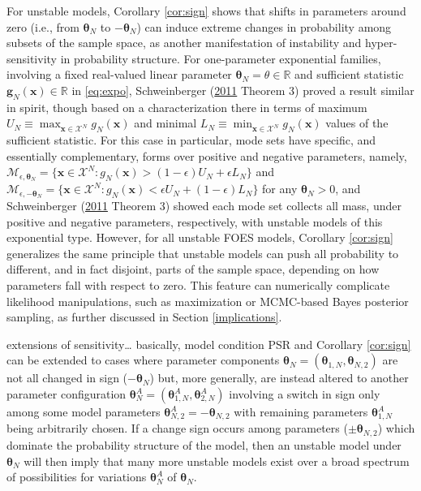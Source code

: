 \documentclass[12pt]{article}
\theoremstyle{definition}
\let\BeginKnitrBlock\begin \let\EndKnitrBlock\end
\begin{document}
For unstable models, Corollary \ref{cor:sign} shows that shifts in
parameters around zero (i.e., from \(\boldsymbol \theta_N\) to
\(-\boldsymbol \theta_N\)) can induce extreme changes in probability
among subsets of the sample space, as another manifestation of
instability and hyper-sensitivity in probability structure. For
one-parameter exponential families, involving a fixed real-valued linear
parameter \(\boldsymbol \theta_N = \theta \in \mathbb{R}\) and
sufficient statistic \(\boldsymbol g_N(\boldsymbol x)\in \mathbb{R}\) in
\eqref{eq:expo}, Schweinberger
(\protect\hyperlink{ref-schweinberger2011instability}{2011} Theorem 3)
proved a result similar in spirit, though based on a characterization
there in terms of maximum
\(U_N \equiv \max_{\boldsymbol x\in\mathcal{X}^N}g_N(\boldsymbol x)\)
and minimal
\(L_N \equiv \min_{\boldsymbol x\in\mathcal{X}^N}g_N(\boldsymbol x)\)
values of the sufficient statistic. For this case in particular, mode
sets have specific, and essentially complementary, forms over positive
and negative parameters, namely,
\(\mathcal{M}_{\epsilon, \boldsymbol \theta_N} = \{\boldsymbol x \in\mathcal{X}^N: g_N(\boldsymbol x) > (1-\epsilon) U_N + \epsilon L_N \}\)
and
\(\mathcal{M}_{\epsilon, -\boldsymbol \theta_N} = \{\boldsymbol x \in\mathcal{X}^N: g_N(\boldsymbol x) < \epsilon U_N + (1-\epsilon) L_N \}\)
for any \(\boldsymbol \theta_N>0\), and Schweinberger
(\protect\hyperlink{ref-schweinberger2011instability}{2011} Theorem 3)
showed each mode set collects all mass, under positive and negative
parameters, respectively, with unstable models of this exponential type.
However, for all unstable FOES models, Corollary \ref{cor:sign}
generalizes the same principle that unstable models can push all
probability to different, and in fact disjoint, parts of the sample
space, depending on how parameters fall with respect to zero. This
feature can numerically complicate likelihood manipulations, such as
maximization or MCMC-based Bayes posterior sampling, as further
discussed in Section \ref{implications}.

\BeginKnitrBlock{remark}[need to briefly finish]
\iffalse <span class="remark"><em>Remark (need to briefly finish). \fi{}
extensions of sensitivity\ldots{} basically, model condition PSR and
Corollary \ref{cor:sign} can be extended to cases where parameter
components
\(\boldsymbol \theta_N =(\boldsymbol \theta_{1,N}, \boldsymbol \theta_{N,2})\)
are not all changed in sign (\(-\boldsymbol \theta_N\)) but, more
generally, are instead altered to another parameter configuration
\(\boldsymbol \theta_{N}^A = ( \boldsymbol \theta_{1,N}^A, \boldsymbol \theta_{2,N}^A )\)
involving a switch in sign only among some model parameters
\(\boldsymbol \theta_{N,2}^A=- \boldsymbol \theta_{N,2}\) with remaining
parameters \(\boldsymbol \theta_{1,N}^A\) being arbitrarily chosen. If a
change sign occurs among parameters (\(\pm \boldsymbol \theta_{N,2}\))
which dominate the probability structure of the model, then an unstable
model under \(\boldsymbol \theta_N\) will then imply that many more
unstable models exist over a broad spectrum of possibilities for
variations \(\boldsymbol \theta_{N}^A\) of \(\boldsymbol \theta_N\).
\EndKnitrBlock{remark}
\end{document}
